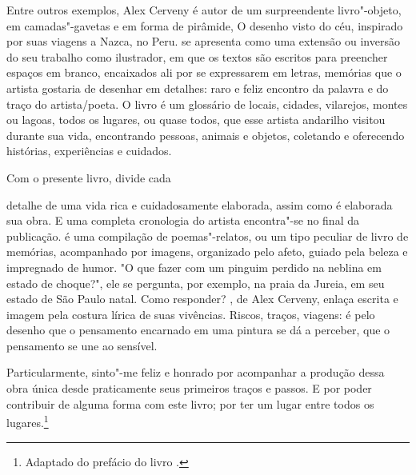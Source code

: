 \begin{multicols}{2}
Entre outros exemplos, Alex Cerveny é autor de um surpreendente livro"-objeto, em camadas"-gavetas e em forma de pirâmide, O desenho visto do céu, inspirado por suas viagens a Nazca, no Peru. {} se apresenta como uma extensão ou inversão do seu trabalho como ilustrador, em que os textos são escritos para preencher espaços em branco, encaixados ali por se expressarem em letras, memórias que o artista gostaria de desenhar em detalhes: raro e feliz encontro da palavra e do traço do artista/poeta. O livro é um glossário de locais, cidades, vilarejos, montes ou lagoas, todos os lugares, ou quase todos, que esse artista andarilho visitou durante sua vida, encontrando pessoas, animais e objetos, coletando e oferecendo histórias, experiências e cuidados. 


Com o presente livro, divide cada
\begin{figure}\end{figure}detalhe de uma vida rica e cuidadosamente elaborada, assim como é elaborada sua obra. E uma completa cronologia do artista encontra"-se no final da publicação. {} é uma compilação de poemas"-relatos, ou um tipo peculiar de livro de memórias, acompanhado por imagens, organizado pelo afeto, guiado pela beleza e impregnado de humor. "O que fazer com um pinguim perdido na neblina em estado de choque?", ele se pergunta, por exemplo, na praia da Jureia, em seu estado de São Paulo natal. Como responder? {}, de Alex Cerveny, enlaça escrita e imagem pela costura lírica de suas vivências. Riscos, traços, viagens: é pelo desenho que o pensamento encarnado em uma pintura se dá a perceber, que o pensamento se une ao sensível. 

Particularmente, sinto"-me feliz e honrado por acompanhar a produção dessa obra única desde praticamente seus primeiros traços e passos. E por poder contribuir de alguma forma com este livro; por ter um lugar entre todos os lugares.\footnote[1]{Adaptado do prefácio do livro {}.} \enlargethispage{\baselineskip}
\end{multicols}

\pagebreak %

